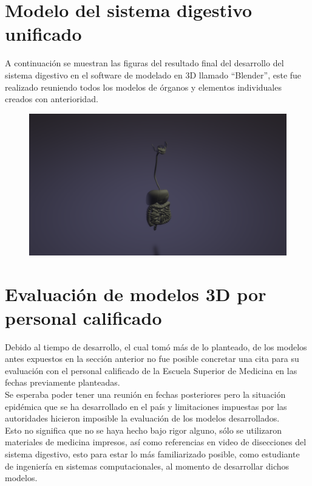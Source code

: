 \section{Modelo del sistema digestivo unificado}
A continuación se muestran las figuras del resultado final del desarrollo del sistema digestivo en el software de modelado en 3D llamado “Blender”, este fue realizado reuniendo todos los modelos de órganos y elementos individuales creados con anterioridad.\\
\begin{figure}[H]
	\begin{center}
 		\includegraphics[width = 1\textwidth]{source/images/image24.png}
	\end{center} 
\end{figure}

\section{Evaluación de modelos 3D por personal calificado}
Debido al tiempo de desarrollo, el cual tomó más de lo planteado, de los modelos antes expuestos en la sección anterior no fue posible concretar una cita 
para su evaluación con el personal calificado  de la Escuela Superior de Medicina en las fechas previamente planteadas.\\
Se esperaba poder tener una reunión en fechas posteriores pero la situación epidémica que se ha desarrollado en el país y 
limitaciones impuestas por las autoridades hicieron imposible la evaluación de los modelos desarrollados.\\
Esto no significa que no se haya hecho bajo rigor alguno, sólo se utilizaron materiales de medicina impresos, así como 
referencias en video de disecciones del sistema digestivo, esto para estar lo más familiarizado posible, como estudiante 
de ingeniería en sistemas computacionales, al momento de desarrollar dichos modelos.\\

